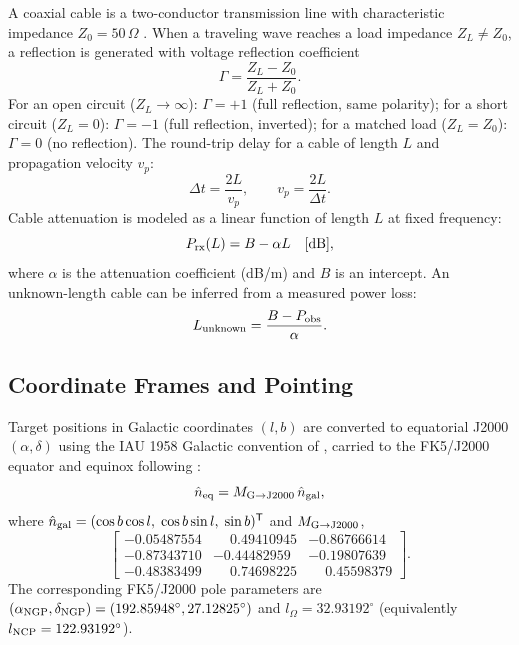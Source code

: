 \documentclass[10pt,preprint2]{aastex}
\begin{document}
A coaxial cable is a two-conductor transmission line with
characteristic impedance $Z_0 = 50\,\Omega$ \citep{parsons2024horn}.
When a traveling wave reaches a load impedance $Z_L \neq Z_0$,
a reflection is generated with voltage reflection coefficient
\begin{equation}
  \Gamma = \frac{Z_L - Z_0}{Z_L + Z_0}.
\end{equation}
For an open circuit ($Z_L \to \infty$): $\Gamma = +1$ (full reflection, same polarity);
for a short circuit ($Z_L = 0$): $\Gamma = -1$ (full reflection, inverted);
for a matched load ($Z_L = Z_0$): $\Gamma = 0$ (no reflection).
The round-trip delay for a cable of length $L$ and propagation velocity $v_p$:
\begin{equation}
  \Delta t = \frac{2L}{v_p},
  \qquad
  v_p = \frac{2L}{\Delta t}.
\end{equation}
Cable attenuation is modeled as a linear function of length $L$ at fixed frequency:
\begin{equation}
  P_{\rm rx}(L) = B - \alpha L \quad [\mathrm{dB}],
\end{equation}
where $\alpha$ is the attenuation coefficient (dB/m) and $B$ is an intercept.
An unknown-length cable can be inferred from a measured power loss:
\begin{equation}
  L_{\rm unknown} = \frac{B - P_{\rm obs}}{\alpha}.
\end{equation}

\subsection{Coordinate Frames and Pointing}
\label{sec:theory_coords}

Target positions in Galactic coordinates $(l, b)$ are converted to
equatorial J2000 $(\alpha, \delta)$ using the IAU 1958 Galactic convention
of \citet{blaauw1960}, carried to the FK5/J2000 equator and equinox
following \citet{murray1989}:
\begin{equation}
  \hat{n}_{\rm eq} = M_{\rm G\to J2000}\,\hat{n}_{\rm gal},
\end{equation}
where $\hat{n}_{\rm gal} = (\cos b \cos l,\; \cos b \sin l,\; \sin b)^{\mathsf T}$
and $M_{\rm G\to J2000}$,
\begin{equation}
  \begin{bmatrix}
    -0.05487554 &  \phantom{-}0.49410945 & -0.86766614 \\
    -0.87343710 & -0.44482959            & -0.19807639 \\
    -0.48383499 &  \phantom{-}0.74698225 &  \phantom{-}0.45598379
  \end{bmatrix}.
\end{equation}
The corresponding FK5/J2000 pole parameters are
$(\alpha_{\rm NGP}, \delta_{\rm NGP}) = (192.85948^\circ, 27.12825^\circ)$
and $l_\Omega = 32.93192^\circ$ (equivalently
$l_{\rm NCP} = 122.93192^\circ$).
\end{document}
